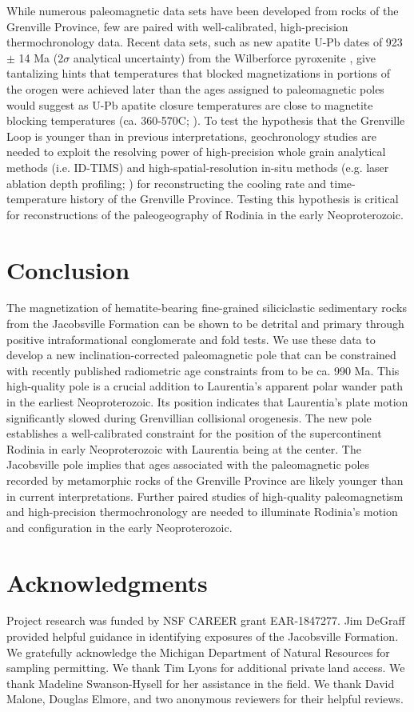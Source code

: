 While numerous paleomagnetic data sets have been developed from rocks of the Grenville Province, few are paired with well-calibrated, high-precision thermochronology data. Recent data sets, such as new apatite U-Pb dates of 923 $\pm$ 14 Ma (2$\sigma$ analytical uncertainty) from the Wilberforce pyroxenite \citep{Paul2021a}, give tantalizing hints that temperatures that blocked magnetizations in portions of the orogen were achieved later than the ages assigned to paleomagnetic poles would suggest as U-Pb apatite closure temperatures are close to magnetite blocking temperatures (ca. 360-570\textdegree C; \citealp{Cherniak1991a}). To test the hypothesis that the Grenville Loop is younger than in previous interpretations, geochronology studies are needed to exploit the resolving power of high-precision whole grain analytical methods (i.e. ID-TIMS) and high-spatial-resolution in-situ methods (e.g. laser ablation depth profiling; \citealp{Chew2021a}) for reconstructing the cooling rate and time-temperature history of the Grenville Province. Testing this hypothesis is critical for reconstructions of the paleogeography of Rodinia in the early Neoproterozoic. 

\section*{Conclusion}

The magnetization of hematite-bearing fine-grained siliciclastic sedimentary rocks from the Jacobsville Formation can be shown to be detrital and primary through positive intraformational conglomerate and fold tests. We use these data to develop a new inclination-corrected paleomagnetic pole that can be constrained with recently published radiometric age constraints from \cite{Hodgin2022a} to be ca. 990 Ma. This high-quality pole is a crucial addition to Laurentia's apparent polar wander path in the earliest Neoproterozoic. Its position indicates that Laurentia's plate motion significantly slowed during Grenvillian collisional orogenesis. The new pole establishes a well-calibrated constraint for the position of the supercontinent Rodinia in early Neoproterozoic with Laurentia being at the center. The Jacobsville pole implies that ages associated with the paleomagnetic poles recorded by metamorphic rocks of the Grenville Province are likely younger than in current interpretations. Further paired studies of high-quality paleomagnetism and high-precision thermochronology are needed to illuminate Rodinia's motion and configuration in the early Neoproterozoic. 


\section*{Acknowledgments}
Project research was funded by NSF CAREER grant EAR-1847277. Jim DeGraff provided helpful guidance in identifying exposures of the Jacobsville Formation. We gratefully acknowledge the Michigan Department of Natural Resources for sampling permitting. We thank Tim Lyons for additional private land access. We thank Madeline Swanson-Hysell for her assistance in the field. We thank David Malone, Douglas Elmore, and two anonymous reviewers for their helpful reviews. 
